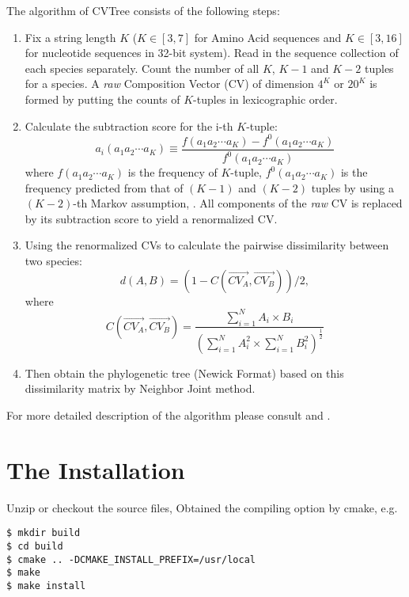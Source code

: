 \documentclass[a4paper,12pt]{article}
\begin{document}
The algorithm of CVTree consists of the following steps:
\begin{enumerate}\itemsep 0pt
\item Fix a string length $K$ ($K\in [3,7]$ for Amino Acid sequences and
  $K\in [3,16]$ for nucleotide sequences in 32-bit system). Read in the
  sequence collection of each species separately. Count the number of
  all $K$, $K-1$ and $K-2$ tuples for a species. A {\it raw} Composition
  Vector (CV) of dimension $4^K$ or ${20}^K$ is formed by putting the
  counts of $K$-tuples in lexicographic order.
  \item Calculate the subtraction score for the i-th $K$-tuple:
\begin{equation*}
  a_i(a_1a_2 \cdots a_K) \equiv \frac{f(a_1a_2 \cdots a_K) -
    f^0(a_1a_2 \cdots a_K)}{f^0(a_1a_2 \cdots a_K)}
\end{equation*}
where $f(a_1a_2 \cdots a_K)$ is the frequency of $K$-tuple, $f^0(a_1a_2
\cdots a_K)$ is the frequency predicted from that of $(K-1)$ and $(K-2)$
tuples by using a $(K-2)$-th Markov assumption, \cite{qwh04,hq04}.  All
components of the {\it raw} CV is replaced by its subtraction score to
yield a renormalized CV.
\item Using the renormalized CVs to calculate the pairwise dissimilarity
  between two species:
  $$d(A, B)=(1-C(\vec{CV_A},\vec{CV_B}))/2,$$
where
\begin{equation*}
  C(\vec{CV_A},\vec{CV_B})=\frac{\sum_{i=1}^NA_i \times
    B_i}{(\sum_{i=1}^NA_i^2 \times \sum_{i=1}^NB_i^2)^{\frac{1}{2}}}
\end{equation*}

\item Then obtain the phylogenetic tree (Newick Format) based on this
  dissimilarity matrix by Neighbor Joint method.
\end{enumerate}
For more detailed description of the algorithm please consult
\cite{qwh04} and \cite{hq04}.



\section{The Installation}

Unzip or checkout the source files, Obtained the compiling option by
cmake, e.g.
\begin{verbatim} 
$ mkdir build
$ cd build
$ cmake .. -DCMAKE_INSTALL_PREFIX=/usr/local
$ make 
$ make install
\end{verbatim}
\end{document}
